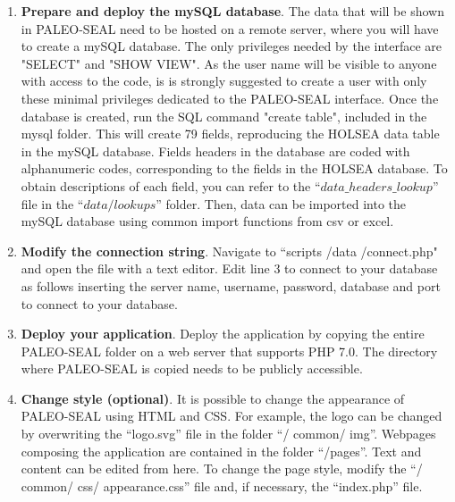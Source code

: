 \documentclass[a4paper,fleqn]{cas-dc}
\begin{document}
\begin{enumerate}
\item \textbf{Prepare and deploy the mySQL database}. The data that will be shown in PALEO-SEAL need to be hosted on a remote server, where you will have to create a mySQL database. The only privileges needed by the interface are "SELECT" and "SHOW VIEW". As the user name will be visible to anyone with access to the code, is is strongly suggested to create a user with only these minimal privileges dedicated to the PALEO-SEAL interface. Once the database is created, run the SQL command "create table", included in the mysql folder. This will create 79 fields, reproducing the HOLSEA data table in the mySQL database. Fields headers in the database are coded with alphanumeric codes, corresponding to the fields in the HOLSEA database. To obtain descriptions of each field, you can refer to the ``$data\_headers\_lookup$'' file in the ``$data/lookups$'' folder. Then, data can be imported into the mySQL database using common import functions from csv or excel.

\item \textbf{Modify the connection string}. Navigate to ``scripts /data /connect.php" and open the file with a text editor. Edit line 3 to connect to your database as follows inserting the server name, username, password, database and port to connect to your database.

\item \textbf{Deploy your application}. Deploy the application by copying the entire PALEO-SEAL folder on a web server that supports PHP 7.0. The directory where PALEO-SEAL is copied needs to be publicly accessible.

\item \textbf{Change style (optional)}. It is possible to change the appearance of PALEO-SEAL using HTML and CSS. For example, the logo can be changed by overwriting the ``logo.svg'' file in the folder ``/ common/ img''. Webpages composing the application are contained in the folder ``/pages''. Text and content can be edited from here. To change the page style, modify the ``/ common/ css/ appearance.css'' file and, if necessary, the ``index.php'' file.
\end{enumerate}
\end{document}
